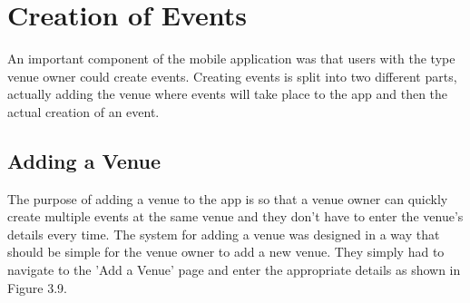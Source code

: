 \section{Creation of Events}
An important component of the mobile application was that users with the type venue owner could create events. Creating events is split into two different parts, actually adding the venue where events will take place to the app and then the actual creation of an event.

\subsection{Adding a Venue}
The purpose of adding a venue to the app is so that a venue owner can quickly create multiple events at the same venue and they don't have to enter the venue's details every time. The system for adding a venue was designed in a way that should be simple for the venue owner to add a new venue. They simply had to navigate to the 'Add a Venue' page and enter the appropriate details as shown in Figure 3.9. 

